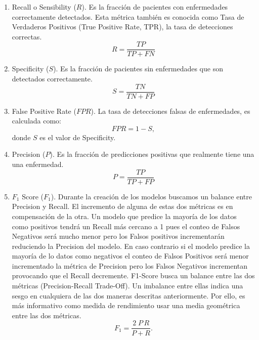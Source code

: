 {\begin{enumerate}
    \item Recall o Sensibility ($R$). Es la fracción de pacientes con enfermedades correctamente
          detectados. Esta métrica también es conocida como Tasa de Verdaderos Positivos (True
          Positive Rate, TPR), la tasa de detecciones correctas.
    \begin{equation}
        \label{eq:TPR}
        R = \frac{TP}{TP + FN}
    \end{equation}

    \item Specificity ($S$). Es la fracción de pacientes sin enfermedades que son detectados
          correctamente.
    \begin{equation}
        \label{eq:Specificity}
        S = \frac{TN}{TN + FP}
    \end{equation}

    \item False Positive Rate ($FPR$). La tasa de detecciones falsas de enfermedades, es calculada
          como:
    \begin{equation}
        \label{eq:FPR}
        FPR = 1 - S,
    \end{equation}
    donde $S$ es el valor de Specificity.

    \item Precision ($P$). Es la fracción de predicciones positivas que realmente tiene una una
          enfermedad.
    \begin{equation}
        \label{eq:P}
        P = \frac{TP}{TP + FP}
    \end{equation}

    \item $F_1$ Score ($F_1$).  Durante la creación de los modelos buscamos un balance entre Precision y
          Recall. El incremento
          de alguna de estas dos métricas es en compensación de la otra. Un modelo que predice la
          mayoría de los datos como positivos tendrá un Recall más cercano a 1 pues el conteo de
          Falsos Negativos será mucho menor pero los Falsos positivos incrementarán reduciendo la
          Precision del modelo. En caso contrario si el modelo predice la mayoría de lo datos como
          negativos el conteo de Falsos Positivos será menor incrementado la métrica de Precision
          pero los Falsos Negativos incrementan provocando que el Recall decremente. F1-Score
          busca un balance entre las dos métricas (Precision-Recall Trade-Off). Un imbalance
          entre ellas indica una sesgo en cualquiera de las dos maneras descritas anteriormente.
          Por ello, es más informativo como medida de rendimiento usar una media geométrica entre
          las dos métricas.
    \begin{equation}
        \label{eq:f1}
        F_1 = \frac{2\; P \, R}{P + R}.
    \end{equation}


\end{enumerate}}
